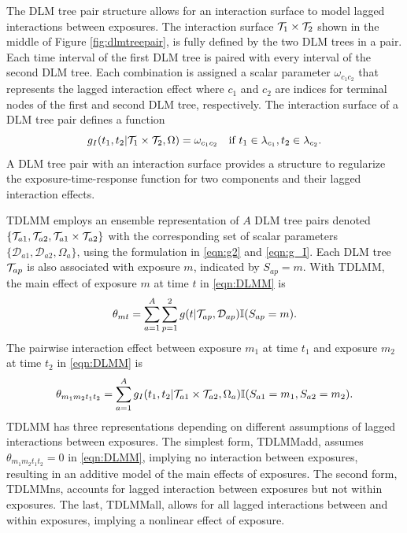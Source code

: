 The DLM tree pair structure allows for an interaction surface to model lagged interactions between exposures. The interaction surface $\mathcal{T}_1 \times \mathcal{T}_2$ shown in the middle of Figure \ref{fig:dlmtreepair}, is fully defined by the two DLM trees in a pair. Each time interval of the first DLM tree is paired with every interval of the second DLM tree. Each combination is assigned a scalar parameter $\omega_{c_1c_2}$ that represents the lagged interaction effect where $c_1$ and $c_2$ are indices for terminal nodes of the first and second DLM tree, respectively. The interaction surface of a DLM tree pair defines a function
\begin{equation}
\label{eqn:g_I}
    g_I(t_1, t_2| \mathcal{T}_{1} \times \mathcal{T}_{2}, \Omega) = \omega_{c_1c_2} \quad \text{if } t_1 \in \lambda_{c_1}, t_2 \in \lambda_{c_2}.
\end{equation}
A DLM tree pair with an interaction surface provides a structure to regularize the exposure-time-response function for two components and their lagged interaction effects.

TDLMM employs an ensemble representation of $A$ DLM tree pairs denoted $\{\mathcal{T}_{a1}, \mathcal{T}_{a2}, \mathcal{T}_{a1} \times \mathcal{T}_{a2}\}$ with the corresponding set of scalar parameters $\{\mathcal{D}_{a1}, \mathcal{D}_{a2}, \Omega_a \}$, using the formulation in \eqref{eqn:g2} and \eqref{eqn:g_I}. Each DLM tree $\mathcal{T}_{ap}$ is also associated with exposure $m$, indicated by $S_{ap} = m$. With TDLMM, the main effect of exposure $m$ at time $t$ in \eqref{eqn:DLMM} is
\begin{equation}
    \label{eqn:TDLMMmain}
    \theta_{mt} = \sum^A_{a = 1} \sum^2_{p=1} g(t| \mathcal{T}_{ap}, \mathcal{D}_{ap}) \mathbb{I}(S_{ap} = m).
\end{equation}
The pairwise interaction effect between exposure $m_1$ at time $t_1$ and exposure $m_2$ at time $t_2$ in \eqref{eqn:DLMM} is
\begin{equation}
    \label{eqn:TDLMMint}
    \theta_{m_1m_2t_1t_2} = \sum^A_{a=1}g_I(t_1, t_2| \mathcal{T}_{a1} \times \mathcal{T}_{a2}, \Omega_a) \mathbb{I}(S_{a1} = m_1, S_{a2} = m_2).
\end{equation}
TDLMM has three representations depending on different assumptions of lagged interactions between exposures. The simplest form, TDLMMadd, assumes $\theta_{m_1m_2t_1t_2} = 0$ in \eqref{eqn:DLMM}, implying no interaction between exposures, resulting in an additive model of the main effects of exposures. The second form, TDLMMns, accounts for lagged interaction between exposures but not within exposures. The last, TDLMMall, allows for all lagged interactions between and within exposures, implying a nonlinear effect of exposure.

